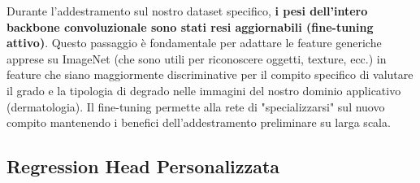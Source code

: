 Durante l'addestramento sul nostro dataset specifico, \textbf{i pesi dell'intero backbone convoluzionale sono stati resi aggiornabili (fine-tuning attivo)}. Questo passaggio è fondamentale per adattare le feature generiche apprese su ImageNet (che sono utili per riconoscere oggetti, texture, ecc.) in feature che siano maggiormente discriminative per il compito specifico di valutare il grado e la tipologia di degrado nelle immagini del nostro dominio applicativo (dermatologia). Il fine-tuning permette alla rete di "specializzarsi" sul nuovo compito mantenendo i benefici dell'addestramento preliminare su larga scala.

\subsection{Regression Head Personalizzata}

